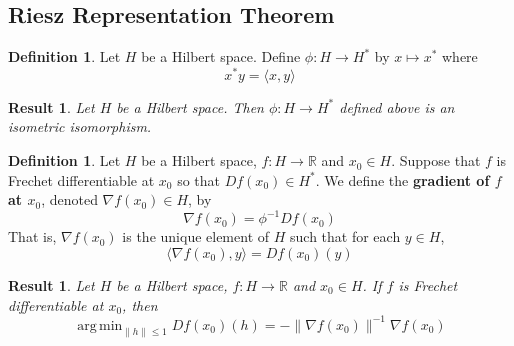 \documentclass[notheorems]{beamer}
\newtheorem{res}[thm]{Result}
\theoremstyle{definition}
\newtheorem{defn}[definition]{Definition}
\theoremstyle{definition}
\newcommand{\R}{\mathbb{R}}
\renewcommand{\r}{\rangle}
\renewcommand{\l}{\langle}
\DeclareMathOperator*{\argmin}{arg\,min}
\begin{document}
\subsection{Riesz Representation Theorem}
\begin{frame}


\begin{defn}
Let $H$ be a Hilbert space. Define $\phi:H \rightarrow H^*$ by $x \mapsto x^*$ where $$x^*y = \l x ,y\r$$
\end{defn}
\pause

\begin{res}
Let $H$ be a Hilbert space. Then $\phi: H \rightarrow H^*$ defined above is an isometric isomorphism.
\end{res}

\end{frame}














\begin{frame}

\begin{defn}
Let $H$ be a Hilbert space, $f: H \rightarrow \R$ and $x_0 \in H$. Suppose that $f$ is Frechet differentiable at $x_0$ so that $Df(x_0) \in H^*$. We define the \textbf{gradient of $f$ at $x_0$}, denoted $\nabla f(x_0) \in H$, by $$\nabla f(x_0) = \phi^{-1}Df(x_0)$$ That is, $\nabla f(x_0)$ is the unique element of $H$ such that for each $y \in H$, $$\l \nabla f(x_0), y \r = Df(x_0)(y)$$
\end{defn}
\pause

\begin{res}
Let $H$ be a Hilbert space, $f:H \rightarrow \R$ and $x_0 \in H$. If $f$ is Frechet differentiable at $x_0$, then 
$$\argmin_{\|h\| \leq 1} Df(x_0)(h) = - \|\nabla f(x_0)\|^{-1} \nabla f(x_0)$$ 
\end{res} 
\end{frame}
\end{document}
